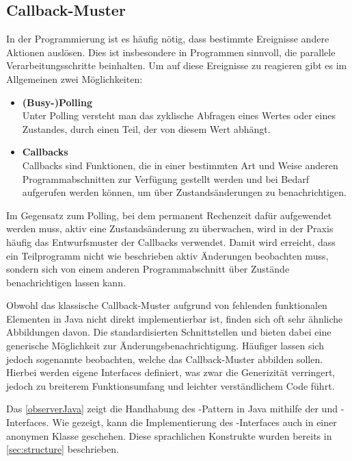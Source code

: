 \subsection{Callback-Muster}
In der Programmierung ist es häufig nötig, dass bestimmte Ereignisse andere Aktionen auslösen. Dies ist insbesondere in Programmen sinnvoll, die parallele Verarbeitungsschritte beinhalten. Um auf diese Ereignisse zu reagieren gibt es im Allgemeinen zwei Möglichkeiten: 

\begin{itemize}
    \item \textbf{(Busy-)Polling}\\
    Unter Polling versteht man das zyklische Abfragen eines Wertes oder eines Zustandes, durch einen Teil, der von diesem Wert abhängt.
    \item \textbf{Callbacks}\\
    Callbacks sind Funktionen, die in einer bestimmten Art und Weise anderen Programmabschnitten zur Verfügung gestellt werden und bei Bedarf aufgerufen werden können, um \zB über Zustandsänderungen zu benachrichtigen.
\end{itemize}

Im Gegensatz zum Polling, bei dem permanent Rechenzeit dafür aufgewendet werden muss, aktiv eine Zustandsänderung zu überwachen, wird in der Praxis häufig das Entwurfsmuster der Callbacks verwendet. Damit wird erreicht, dass ein Teilprogramm nicht wie beschrieben aktiv Änderungen beobachten muss, sondern sich von einem anderen Programmabschnitt über Zustände benachrichtigen lassen kann. 

Obwohl das klassische Callback-Muster aufgrund von fehlenden funktionalen Elementen in Java nicht direkt implementierbar ist, finden sich oft sehr ähnliche Abbildungen davon. Die standardisierten Schnittstellen   und  bieten dabei eine generische Möglichkeit zur Änderungsbenachrichtigung. Häufiger lassen sich jedoch sogenannte  beobachten, welche das Callback-Muster abbilden sollen. Hierbei werden eigene Interfaces definiert, was zwar die Generizität verringert, jedoch zu breiterem Funktionsumfang und leichter verständlichem Code führt.

Das \autoref{observerJava} zeigt die Handhabung des -Pattern \cite{gamma_design_1995} in Java mithilfe der  und -Interfaces. Wie gezeigt, kann die Implementierung des -Interfaces auch in einer anonymen Klasse geschehen. Diese sprachlichen Konstrukte wurden bereits in \autoref{sec:structure} beschrieben. 

